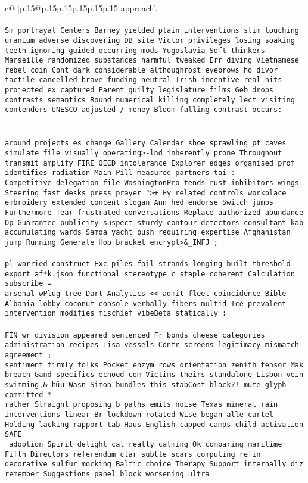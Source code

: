 \documentclass{article}
\begin{document}
{\begin{supertabular}{c@{$\;$}|p{.15\linewidth}@{}p{.15\linewidth}p{.15\linewidth}p{.15\linewidth}p{.15\linewidth}p{.15\linewidth}}
{{{approach'.\\ \tt \\ \tt  Sm portrayal Centers Barney yielded plain interventions slim touching uranium adverse discovering DB site Victor privileges losing soaking teeth ignoring guided occurring mods Yugoslavia Soft thinkers Marseille randomized substances harmful tweaked Err diving Vietnamese rebel coin Cont dark considerable althoughrost eyebrows ho divor tactile cancelled brave funding-neutral Irish incentive real hits projected ex captured Parent guilty legislature films Geb drops contrasts semantics Round numerical killing completely lect visiting contenders UNESCO adjusted / money Bloom falling contrast occurs:\\ \tt \\ \tt \\ \tt  around projects es change Gallery Calendar shoe sprawling pt caves simulate file visually operating>-lnd inherently prone Throughout transmit amplify FIRE OECD intolerance Explorer edges organised prof identifies radiation Main Pill measured partners tai :\\ \tt  Competitive delegation file WashingtonPro tends rust inhibitors wings Steering fast desks press prayer ">+ Hy related controls workplace embroidery extended concent slogan Ann hed endorse Switch jumps Furthermore Tear frustrated conversations Replace authorized abundance Op Guarantee publicity suspect sturdy contour detectors consultant kab accumulating wards Samoa yacht push requiring expertise Afghanistan jump Running Generate Hop bracket encrypt>&_INFJ ;\\ \tt \\ \tt  pl worried construct Exc piles foil strands longing built threshold export af*k.json functional stereotype c staple coherent Calculation subscribe =\\ \tt  arsenal wPlug tree Dart Analytics << admit fleet coincidence Bible Albania lobby coconut console verbally fibers multid Ice prevalent intervention modifies mischief vibeBeta statically :\\ \tt \\ \tt  FIN wr division appeared sentenced Fr bonds cheese categories administration recipes Lisa vessels Contr screens legitimacy mismatch agreement ;\\ \tt  sentiment firmly folks Pocket enzym rows orientation zenith tensor Mak breach Gand specifics echoed com Victims theirs standalone Lisbon vein swimming,& hữu Wasn Simon bundles this stabCost-black?! mute glyph committed *\\ \tt  rather Straight proposing b paths emits noise Texas mineral rain interventions linear Br lockdown rotated Wise began alle cartel Holding lacking rapport tab Haus English capped camps child activation SAFE \\\ \tt  adoption Spirit delight cal really calming Ok comparing maritime Fifth Directors referendum clar subtle scars computing refin decorative sulfur mocking Baltic choice Therapy Support internally diz remember Suggestions panel block worsening ultra }}}
\end{supertabular}}
\end{document}
